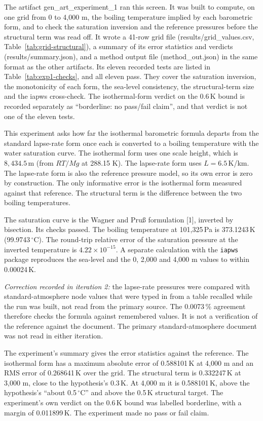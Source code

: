 \documentclass[11pt,letterpaper]{article}
\begin{document}
The artifact gen\_art\_experiment\_1 ran this screen. It was built to compute, on one grid from 0 to 4,000 m, the boiling temperature implied by each barometric form, and to check the saturation inversion and the reference pressures before the structural term was read off. It wrote a 41-row grid file (results/grid\_values.csv, Table~\ref{tab:grid-structural}), a summary of its error statistics and verdicts (results/summary.json), and a method output file (method\_out.json) in the same format as the other artifacts. Its eleven recorded tests are listed in Table~\ref{tab:exp1-checks}, and all eleven pass. They cover the saturation inversion, the monotonicity of each form, the sea-level consistency, the structural-term size and the iapws cross-check. The isothermal-form verdict on the 0.6\,K bound is recorded separately as ``borderline: no pass/fail claim'', and that verdict is not one of the eleven tests.

This experiment asks how far the isothermal barometric formula departs from the standard lapse-rate form once each is converted to a boiling temperature with the water saturation curve. The isothermal form uses one scale height, which is $8{,}434.5$\,m (from $RT/Mg$ at 288.15 K). The lapse-rate form uses $L = 6.5$\,K/km. The lapse-rate form is also the reference pressure model, so its own error is zero by construction. The only informative error is the isothermal form measured against that reference. The structural term is the difference between the two boiling temperatures.

The saturation curve is the Wagner and Pru\ss{} formulation [1], inverted by bisection. Its checks passed. The boiling temperature at 101,325\,Pa is 373.1243\,K (99.9743\,$^\circ$C). The round-trip relative error of the saturation pressure at the inverted temperature is $4.22 \times 10^{-15}$. A separate calculation with the \texttt{iapws} package reproduces the sea-level and the 0, 2,000 and 4,000 m values to within 0.00024\,K.

\emph{Correction recorded in iteration 2:} the lapse-rate pressures were compared with standard-atmosphere node values that were typed in from a table recalled while the run was built, not read from the primary source. The 0.0073\,\% agreement therefore checks the formula against remembered values. It is not a verification of the reference against the document. The primary standard-atmosphere document was not read in either iteration.

The experiment's summary gives the error statistics against the reference. The isothermal form has a maximum absolute error of 0.588101\,K at 4,000 m and an RMS error of 0.268641\,K over the grid. The structural term is 0.332247\,K at 3,000 m, close to the hypothesis's 0.3\,K. At 4,000 m it is 0.588101\,K, above the hypothesis's ``about 0.5\,$^\circ$C'' and above the 0.5\,K structural target. The experiment's own verdict on the 0.6\,K bound was labelled borderline, with a margin of 0.011899\,K. The experiment made no pass or fail claim.
\end{document}

